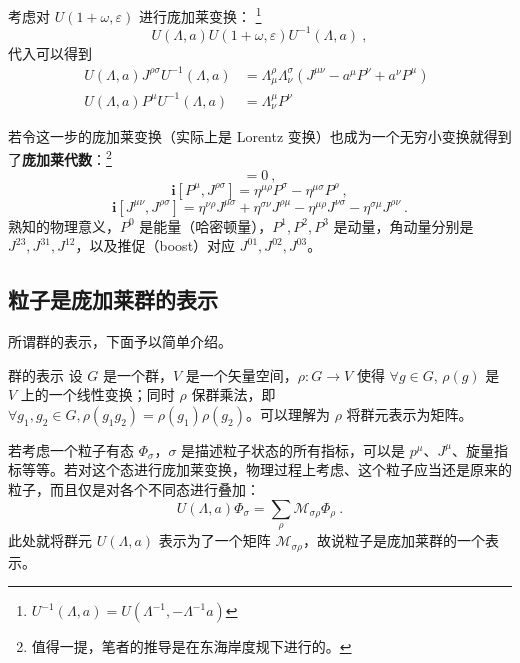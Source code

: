 考虑对 $U(1+\omega, \varepsilon)$ 进行庞加莱变换： \footnote{$U^{-1}(\Lambda, a) = U(\Lambda^{-1}, -\Lambda^{-1}a)$}
\begin{equation}
	U(\Lambda, a) U(1+\omega, \varepsilon) U^{-1}(\Lambda, a) ~,
\end{equation}
代入可以得到 
\begin{equation}
	\begin{aligned}
		U(\Lambda, a) J^{\rho \sigma} U^{-1}(\Lambda, a) &= \Lambda_{\mu}^\rho \Lambda_\nu ^\sigma(J^{\mu\nu} - a^\mu P^\nu + a^\nu P^\mu) \\ 
		U(\Lambda, a) P^\mu U^{-1}(\Lambda, a) &= \Lambda_{\nu}^\mu P^\nu ~~
	\end{aligned}~~
\end{equation}

若令这一步的庞加莱变换（实际上是 Lorentz 变换）也成为一个无穷小变换就得到了\textbf{\textbf{庞加莱代数}}：\footnote{值得一提，笔者的推导是在东海岸度规下进行的。}
\begin{equation}
	[P^\mu, P^\nu] = 0 ~,
\end{equation}
\begin{equation}
	\mathbf{i} [P^\mu, J^{\rho \sigma}] = \eta^{\mu \rho} P^\sigma - \eta^{\mu \sigma} P^\rho ~,
\end{equation}
\begin{equation}
	\mathbf{i} [J^{\mu\nu}, J^{\rho \sigma}] = \eta^{\nu \rho} J^{\mu \sigma} + \eta^{\sigma \nu} J^{\rho \mu} - \eta^{\mu \rho} J^{\nu \sigma} - \eta^{\sigma \mu} J^{\rho \nu} ~.
\end{equation}
熟知的物理意义，$P^0$ 是能量（哈密顿量），$P^{1}, P^2, P^3$ 是动量，角动量分别是 $J^{23}, J^{31}, J^{12}$，以及推促（boost）对应 $J^{01}, J^{02}, J^{03}$。

\subsection{粒子是庞加莱群的表示}
所谓群的表示，下面予以简单介绍。
\begin{definition}{群的表示}
	设 $G$ 是一个群，$V$ 是一个矢量空间，$\rho: G \to V$ 使得 $\forall g \in G$, $\rho(g)$ 是 $V$ 上的一个线性变换；同时 $\rho$ 保群乘法，即 $\forall g_1, g_2 \in G, \rho(g_1 g_2) = \rho(g_1) \rho(g_2)$。可以理解为 $\rho$ 将群元表示为矩阵。
\end{definition}

若考虑一个粒子有态 $\Phi_{\sigma}$，$\sigma$ 是描述粒子状态的所有指标，可以是 $p^\mu$、$J^\mu$、旋量指标等等。若对这个态进行庞加莱变换，物理过程上考虑、这个粒子应当还是原来的粒子，而且仅是对各个不同态进行叠加：
\begin{equation}
	U(\Lambda, a) \Phi_\sigma = \sum_{\rho }\mathcal M_{\sigma \rho} \Phi_{\rho} ~.
\end{equation}
此处就将群元 $U(\Lambda, a)$ 表示为了一个矩阵 $\mathcal M_{\sigma \rho}$，故说粒子是庞加莱群的一个表示。

